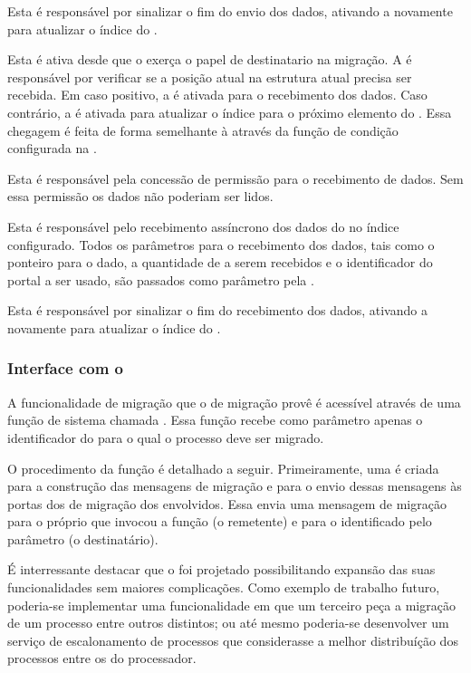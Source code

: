 \begin{description}[leftmargin=*,labelwidth=!,labelindent=0pt]
    \item[8.] Esta \task é responsável por sinalizar o fim do envio dos dados, ativando a  novamente para atualizar o índice do \buffer.
    \item[9.] Esta \task é ativa desde que o \cluster exerça o papel de destinatario na migração. A \task é responsável por verificar se a posição atual na estrutura atual precisa ser recebida. Em caso positivo, a  é ativada para o recebimento dos dados. Caso contrário, a  é ativada para atualizar o índice para o próximo elemento do \buffer. Essa chegagem é feita de forma semelhante à  \ie através da função de condição configurada na .
    \item[10.] Esta \task é responsável pela concessão de permissão para o recebimento de dados. Sem essa permissão os dados não poderiam ser lidos.
    \item[11.] Esta \task é responsável pelo recebimento assíncrono dos dados do \buffer no índice configurado. Todos os parâmetros para o recebimento dos dados, tais como o ponteiro para o dado, a quantidade de \bytes a serem recebidos e o identificador do portal a ser usado, são passados como parâmetro pela .
    \item[12.] Esta \task é responsável por sinalizar o fim do recebimento dos dados, ativando a  novamente para atualizar o índice do \buffer.

\end{description}

\subsubsection{Interface com o \Daemon}

A funcionalidade de migração que o \daemon de migração provê é acessível através de uma função de sistema chamada \kmigrateto. Essa função recebe como parâmetro apenas o identificador do \cluster para o qual o processo deve ser migrado.

O procedimento da função \kmigrateto é detalhado a seguir. Primeiramente, uma \task é criada para a construção das mensagens de migração e para o envio dessas mensagens às portas \mailbox dos \daemons de migração dos \clusters envolvidos. Essa \task envia uma mensagem de migração para o próprio \cluster que invocou a função \kmigrateto (o remetente) e para o \cluster identificado pelo parâmetro (o destinatário).

É interressante destacar que o \daemon foi projetado possibilitando expansão das suas funcionalidades sem maiores complicações. Como exemplo de trabalho futuro, poderia-se implementar uma funcionalidade em que um terceiro \cluster peça a migração de um processo entre outros \clusters distintos; ou até mesmo poderia-se desenvolver um serviço de escalonamento de processos que considerasse a melhor distribuíção dos processos entre os \clusters do processador.